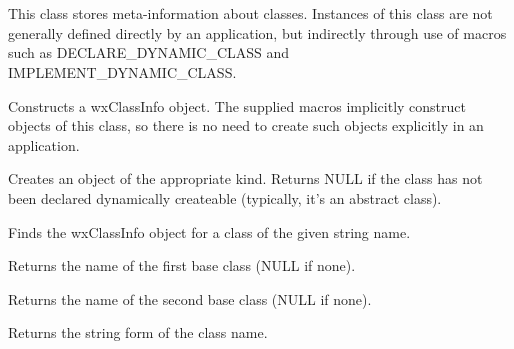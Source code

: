 \section{}\label{wxclassinfo}


This class stores meta-information about classes. Instances of this class are
not generally defined directly by an application, but indirectly through use
of macros such as DECLARE\_DYNAMIC\_CLASS and IMPLEMENT\_DYNAMIC\_CLASS.



Constructs a wxClassInfo object. The supplied macros implicitly construct objects of this
class, so there is no need to create such objects explicitly in an application.



Creates an object of the appropriate kind. Returns NULL if the class has not been declared
dynamically createable (typically, it's an abstract class).



Finds the wxClassInfo object for a class of the given string name.



Returns the name of the first base class (NULL if none).



Returns the name of the second base class (NULL if none).



Returns the string form of the class name.


